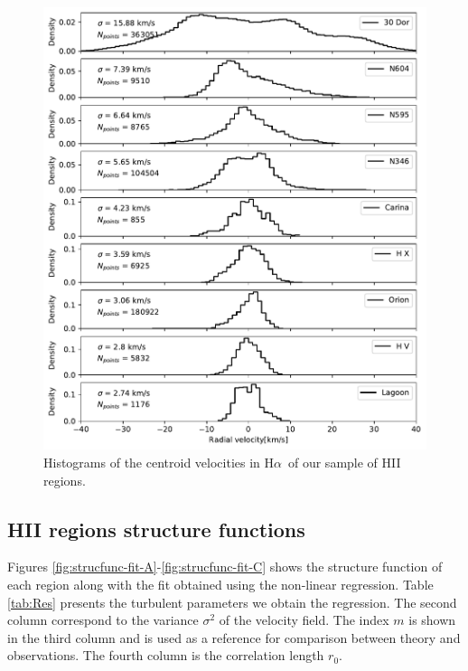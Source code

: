 \documentclass[fleqn,usenatbib, useAMS, a4paper]{mnras}
\newcommand\halpha{H${\alpha}$}
\begin{document}
\begin{figure}
 \centering
 \includegraphics[width=5in]{Figures/Hist/Hist}\par
 \caption{Histograms of the centroid velocities in \halpha\ of our sample of HII regions. }
 \label{fig:hist}
\end{figure}

\subsection{HII regions structure functions}

Figures \ref{fig:strucfunc-fit-A}-\ref{fig:strucfunc-fit-C} shows the structure function of each region along with the fit obtained using the non-linear regression.
Table \ref{tab:Res} presents the turbulent parameters we obtain the regression.
The second column correspond to the variance \(\sigma^2\) of the velocity field.
The index \(m\) is shown in the third column and is used as a reference for comparison between theory and observations.
The fourth column is the correlation length \(r_0\).
\end{document}
